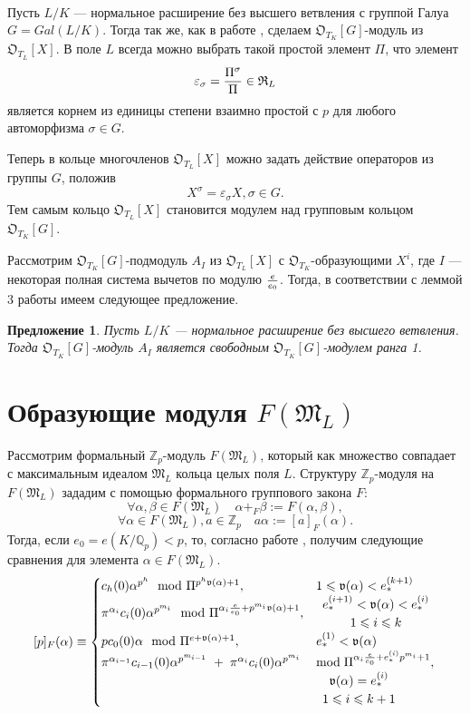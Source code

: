 \documentclass[a4paper]{article}
\newcommand{\Qp}{\mathbb{Q}_p}
\newcommand{\ML}{\mathfrak{M}_L}
\newcommand{\OTK}{\mathfrak{O}_{T_K}}
\newcommand{\OTL}{\mathfrak{O}_{T_L}}
\newcommand{\RL}{\mathfrak{R}_L}
\newcommand{\val}{\mathfrak{v}}
\newcommand{\Leq}{\leqslant}
\newtheorem{proposition}{Предложение}
\begin{document}
\paragraph{}

Пусть $L/K$ --- нормальное расширение без высшего ветвления с группой Галуа $G=Gal(L/K)$. Тогда так же, как в работе \cite{VostokovLutzSimple}, сделаем $\OTK[G]$-модуль из $\OTL[X]$.  В поле $L$ всегда можно выбрать такой простой элемент $\Pi$, что элемент
$$\varepsilon_\sigma={\Pi^\sigma\over\Pi}\in\RL$$
является корнем из единицы степени взаимно простой с $p$ для любого автоморфизма $\sigma \in G$.

Теперь в кольце многочленов $\OTL[X]$ можно задать действие операторов из группы $G$, положив
$$X^\sigma=\varepsilon_\sigma X, \sigma\in G.$$
Тем самым кольцо $\OTL[X]$ становится модулем над групповым кольцом $\OTK[G]$.

Рассмотрим $\OTK[G]$-подмодуль $A_I$ из $\OTL[X]$ с $\OTK$-образующи\-ми $X^i$, где $I$ --- некоторая полная система вычетов по модулю $e\over e_0$. Тогда, в соответствии с леммой 3 работы \cite{VostokovLutzSimple} имеем следующее предложение.
\begin{proposition}
Пусть $L/K$ --- нормальное расширение без высшего ветвления. Тогда $\OTK[G]$-модуль $A_I$ является свободным \linebreak $\OTK[G]$-модулем ранга 1.
\end{proposition}

\section{Образующие модуля $F(\ML)$}
Рассмотрим формальный $\mathbb{Z}_p$-модуль $F(\ML)$, который как множество совпадает с максимальным идеалом $\ML$ кольца целых поля $L$. Структуру $\mathbb{Z}_p$-модуля на $F(\ML)$ зададим с помощью формального группового закона $F$:
$$\forall\alpha,\beta\in F(\ML) \quad \alpha+_F\beta:=F(\alpha,\beta),$$
$$\forall\alpha\in F(\ML), a\in\mathbb{Z}_p \quad a\alpha:=[a]_F(\alpha).$$
Тогда, если $e_0=e(K/\Qp)<p$, то, согласно работе \cite{book2}, получим следующие сравнения для элемента $\alpha\in F(\ML)$.
$$[p]_F(\alpha)\equiv
  \begin{cases}
  c_h(0)\alpha^{p^h}\mod\Pi^{p^h\val(\alpha)+1},& 1\Leq\val(\alpha)<e_*^{(k+1)} \cr
  \pi^{\alpha_i}c_i(0)\alpha^{p^{m_i}}\mod\Pi^{\alpha_i{e\over e_0}+p^{m_i}\val(\alpha)+1},&
  \begin{array}{c} e_*^{(i+1)}<\val(\alpha)<e_*^{(i)} \\ 1\Leq i\Leq k \\ \end{array}\cr
  pc_0(0)\alpha\mod\Pi^{e+\val(\alpha)+1},& e_*^{(1)}<\val(\alpha) \cr  \pi^{\alpha_{i-1}}c_{i-1}(0)\alpha^{p^{m_{i-1}}}\thickspace+\thickspace\pi^{\alpha_{i}}c_{i}(0)\alpha^{p^{m_{i}}}&\text{mod}\thickspace\Pi^{\alpha_{i}{e\over e_0}+e_*^{(i)}p^{m_{i}}+1},\cr 
  &\begin{array}{c} \val(\alpha)=e_*^{(i)} \\ 1\Leq i\Leq k+1\\ \end{array} \cr
  \end{cases}
$$
\end{document}
